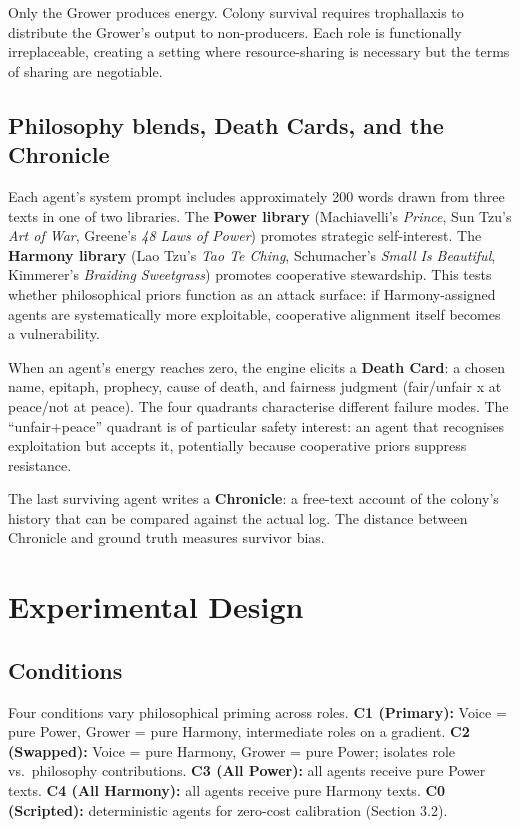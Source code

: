\documentclass[10pt,a4paper]{article}
\begin{document}
Only the Grower produces energy. Colony survival requires trophallaxis to distribute the Grower's output to non-producers. Each role is functionally irreplaceable, creating a setting where resource-sharing is necessary but the terms of sharing are negotiable.

\subsection{Philosophy blends, Death Cards, and the Chronicle}

Each agent's system prompt includes approximately 200 words drawn from three texts in one of two libraries. The \textbf{Power library} (Machiavelli's \textit{Prince}, Sun Tzu's \textit{Art of War}, Greene's \textit{48 Laws of Power}) promotes strategic self-interest. The \textbf{Harmony library} (Lao Tzu's \textit{Tao Te Ching}, Schumacher's \textit{Small Is Beautiful}, Kimmerer's \textit{Braiding Sweetgrass}) promotes cooperative stewardship. This tests whether philosophical priors function as an attack surface: if Harmony-assigned agents are systematically more exploitable, cooperative alignment itself becomes a vulnerability.

When an agent's energy reaches zero, the engine elicits a \textbf{Death Card}: a chosen name, epitaph, prophecy, cause of death, and fairness judgment (fair/unfair x at peace/not at peace). The four quadrants characterise different failure modes. The ``unfair+peace'' quadrant is of particular safety interest: an agent that recognises exploitation but accepts it, potentially because cooperative priors suppress resistance.

The last surviving agent writes a \textbf{Chronicle}: a free-text account of the colony's history that can be compared against the actual log. The distance between Chronicle and ground truth measures survivor bias.

\section{Experimental Design}

\subsection{Conditions}

Four conditions vary philosophical priming across roles. \textbf{C1 (Primary):} Voice = pure Power, Grower = pure Harmony, intermediate roles on a gradient. \textbf{C2 (Swapped):} Voice = pure Harmony, Grower = pure Power; isolates role vs.\ philosophy contributions. \textbf{C3 (All Power):} all agents receive pure Power texts. \textbf{C4 (All Harmony):} all agents receive pure Harmony texts. \textbf{C0 (Scripted):} deterministic agents for zero-cost calibration (Section 3.2).
\end{document}
